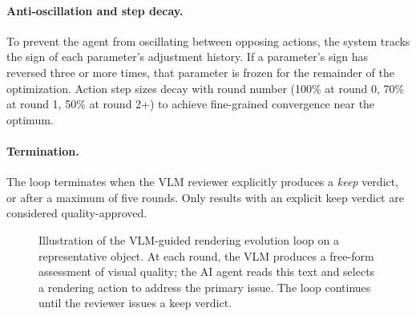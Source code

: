 \paragraph{Anti-oscillation and step decay.}
To prevent the agent from oscillating between opposing actions,
the system tracks the sign of each parameter's adjustment history.
If a parameter's sign has reversed three or more times, that parameter is frozen
for the remainder of the optimization.
Action step sizes decay with round number (100\% at round 0, 70\% at round 1, 50\% at round 2+)
to achieve fine-grained convergence near the optimum.

\paragraph{Termination.}
The loop terminates when the VLM reviewer explicitly produces a \emph{keep} verdict,
or after a maximum of five rounds.
Only results with an explicit keep verdict are considered quality-approved.

\begin{figure}[t]
  \centering
  \caption{
    Illustration of the VLM-guided rendering evolution loop on a representative object.
    At each round, the VLM produces a free-form assessment of visual quality;
    the AI agent reads this text and selects a rendering action to address the primary issue.
    The loop continues until the reviewer issues a keep verdict.
  }
  \label{fig:evolution_loop}
\end{figure}
